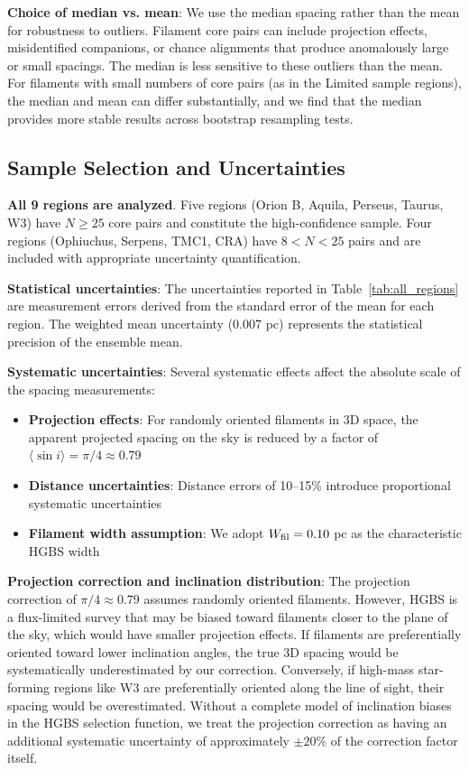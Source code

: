 \documentclass[11pt,a4paper]{article}
\begin{document}
\textbf{Choice of median vs. mean}: We use the median spacing rather than the mean for robustness to outliers. Filament core pairs can include projection effects, misidentified companions, or chance alignments that produce anomalously large or small spacings. The median is less sensitive to these outliers than the mean. For filaments with small numbers of core pairs (as in the Limited sample regions), the median and mean can differ substantially, and we find that the median provides more stable results across bootstrap resampling tests.

\subsection{Sample Selection and Uncertainties}

\textbf{All 9 regions are analyzed}. Five regions (Orion B, Aquila, Perseus, Taurus, W3) have $N \geq 25$ core pairs and constitute the high-confidence sample. Four regions (Ophiuchus, Serpens, TMC1, CRA) have $8 < N < 25$ pairs and are included with appropriate uncertainty quantification.

\textbf{Statistical uncertainties}: The uncertainties reported in Table~\ref{tab:all_regions} are measurement errors derived from the standard error of the mean for each region. The weighted mean uncertainty (0.007 pc) represents the statistical precision of the ensemble mean.

\textbf{Systematic uncertainties}: Several systematic effects affect the absolute scale of the spacing measurements:
\begin{itemize}
    \item \textbf{Projection effects}: For randomly oriented filaments in 3D space, the apparent projected spacing on the sky is reduced by a factor of $\langle \sin i \rangle = \pi/4 \approx 0.79$
    \item \textbf{Distance uncertainties}: Distance errors of 10--15\% introduce proportional systematic uncertainties
    \item \textbf{Filament width assumption}: We adopt $W_{\rm fil} = 0.10$ pc as the characteristic HGBS width \citep{Arzoumanian2011}
\end{itemize}

\textbf{Projection correction and inclination distribution}: The projection correction of $\pi/4 \approx 0.79$ assumes randomly oriented filaments. However, HGBS is a flux-limited survey that may be biased toward filaments closer to the plane of the sky, which would have smaller projection effects. If filaments are preferentially oriented toward lower inclination angles, the true 3D spacing would be systematically underestimated by our correction. Conversely, if high-mass star-forming regions like W3 are preferentially oriented along the line of sight, their spacing would be overestimated. Without a complete model of inclination biases in the HGBS selection function, we treat the projection correction as having an additional systematic uncertainty of approximately $\pm20$\% of the correction factor itself.
\end{document}
